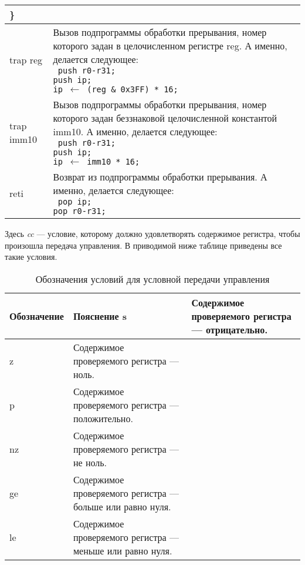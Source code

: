 \documentclass[10pt]{report}
\begin{document}
\begin{longtable}[c]{|l|p{12.5cm}|}
{{{\}
}
}} \\ \hline
trap reg                     & {\parbox{12.4cm}{Вызов подпрограммы обработки прерывания, номер которого задан в целочисленном регистре reg. А именно, делается следующее:\\ %
\texttt{%
\phantom{aaaa}push r0-r31;\\
\phantom{aaaa}push ip;\\
\phantom{aaaa}ip $\leftarrow$ (reg \& 0x3FF) * 16;
}
}} \\ \hline
trap imm10                   & {\parbox{12.4cm}{Вызов подпрограммы обработки прерывания, номер которого задан беззнаковой целочисленной константой imm10. А именно, делается следующее:\\ %
\texttt{%
\phantom{aaaa}push r0-r31;\\
\phantom{aaaa}push ip;\\
\phantom{aaaa}ip $\leftarrow$ imm10 * 16;
}
}} \\ \hline
reti                         & {\parbox{12.4cm}{Возврат из подпрограммы обработки прерывания. А именно, делается следующее:\\ %
\texttt{%
\phantom{aaaa}pop ip;\\
\phantom{aaaa}pop r0-r31;
}
}} \\ \hline
\end{longtable}    


Здесь \textit{cc} --- условие, которому должно удовлетворять содержимое регистра, чтобы произошла передача управления. В приводимой ниже таблице приведены все такие условия.

\begin{longtable}[c]{|l|l|}
\caption{Обозначения условий для условной передачи управления} \\ \hline
{\textbf{Обозначение}} & \textbf{Пояснение} \endhead \hline 
s                      & Содержимое проверяемого регистра --- отрицательно. \\ \hline
z                      & Содержимое проверяемого регистра --- ноль. \\ \hline
p                      & Содержимое проверяемого регистра --- положительно. \\ \hline
nz                     & Содержимое проверяемого регистра --- не ноль. \\ \hline
ge                     & Содержимое проверяемого регистра --- больше или равно нуля. \\ \hline
le                     & Содержимое проверяемого регистра --- меньше или равно нуля. \\ \hline
\end{longtable}
 
\end{document}
